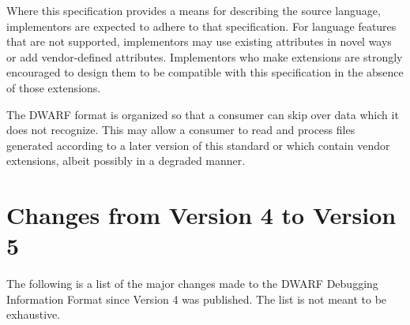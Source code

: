 Where this specification provides a means for
describing the source language, implementors are expected
to adhere to that specification. 
For language features that
are not supported, implementors may use existing attributes
in novel ways or add vendor-defined attributes. 
Implementors
who make extensions are strongly encouraged to design them
to be compatible with this specification in the absence of
those extensions.

The DWARF format is organized so that a consumer can skip over
data which it does not recognize. This may allow a consumer
to read and process files generated according to a later
version of this standard or which contain vendor extensions,
albeit possibly in a degraded manner.

\section{Changes from Version 4 to Version 5}
The following is a list of the major changes made to the 
DWARF Debugging Information Format since Version 4 was published. 
The list is not meant to be exhaustive.
